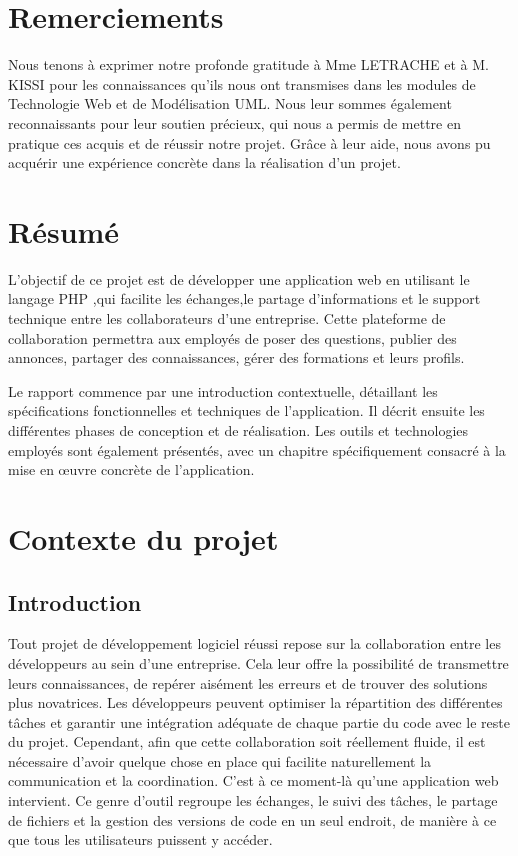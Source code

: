 \documentclass{article}
\begin{document}
    \setcounter{page}{2} 
    \tableofcontents
    \newpage

    \listoffigures

    \listoftables
    \newpage

    \section{Remerciements}
        Nous tenons à exprimer notre profonde gratitude à Mme LETRACHE et à M. KISSI pour les connaissances qu'ils nous ont transmises dans les modules de Technologie Web et de Modélisation UML. Nous leur sommes également reconnaissants pour leur soutien précieux, qui nous a permis de mettre en pratique ces acquis et de réussir notre projet. Grâce à leur aide, nous avons pu acquérir une expérience concrète dans la réalisation d'un projet.
    
    \newpage
    
    \section{Résumé}
        L'objectif de ce projet est de développer une application web en utilisant le langage PHP
        ,qui facilite les échanges,le partage d'informations et le support technique entre les collaborateurs d'une entreprise.
        Cette plateforme de collaboration permettra aux employés de poser des questions, 
        publier des annonces, partager des connaissances, gérer des formations et leurs profils.

        Le rapport commence par une introduction contextuelle, détaillant les spécifications fonctionnelles et techniques de l'application. Il décrit ensuite les différentes phases de conception et de réalisation. Les outils et technologies employés sont également présentés, avec un chapitre spécifiquement consacré à la mise en œuvre concrète de l'application.
    
    \section{Contexte du projet}
        \subsection{Introduction}
            Tout projet de développement logiciel réussi repose sur la collaboration entre les développeurs au sein d'une entreprise. Cela leur offre la possibilité de transmettre leurs connaissances, de repérer aisément les erreurs et de trouver des solutions plus novatrices. Les développeurs peuvent optimiser la répartition des différentes tâches et garantir une intégration adéquate de chaque partie du code avec le reste du projet. Cependant, afin que cette collaboration soit réellement fluide, il est nécessaire d'avoir quelque chose en place qui facilite naturellement la communication et la coordination. C'est à ce moment-là qu'une application web intervient. Ce genre d'outil regroupe les échanges, le suivi des tâches, le partage de fichiers et la gestion des versions de code en un seul endroit, de manière à ce que tous les utilisateurs puissent y accéder.
        
\end{document}
